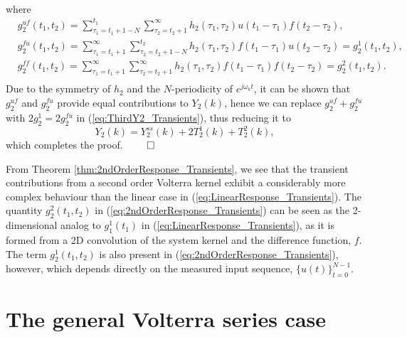 \begin{proof*}
\begin{equation}
\begin{aligned}
\end{aligned}
\end{equation}
where
\begin{equation}
\begin{aligned}
&g_2^{uf}(t_1,t_2) = \sum_{\tau_1 = t_1+1-N}^{t_1} \sum_{\tau_2 = t_2+1}^{\infty} h_2(\tau_1,\tau_2) u(t_1-\tau_1) f(t_2-\tau_2),\\
&g_2^{fu}(t_1,t_2) = \sum_{\tau_1 = t_1+1}^{\infty} \sum_{\tau_2 = t_2+1-N}^{t_2} h_2(\tau_1,\tau_2) f(t_1-\tau_1) u(t_2-\tau_2) = g_2^1(t_1,t_2) ,\\
&g_2^{ff}(t_1,t_2) = \sum_{\tau_1 = t_1+1}^{\infty} \sum_{\tau_2 = t_2+1}^{\infty} h_2(\tau_1,\tau_2) f(t_1-\tau_1) f(t_2-\tau_2) = g_2^2(t_1,t_2).\\
\end{aligned}
\end{equation}
Due to the symmetry of $h_2$ and the $N$-periodicity of $e^{j \omega_k t}$, it can be shown that $g_2^{uf}$ and $g_2^{fu}$ provide equal contributions to $Y_2(k)$, hence we can replace $g_2^{uf}+g_2^{fu}$ with $2 g_2^1 = 2 g_2^{fu}$ in (\ref{eq:ThirdY2_Transients}), thus reducing it to
\begin{equation}
Y_2(k) = Y_2^{ss}(k) + 2T_2^1(k) + T_2^2(k),
\end{equation}
which completes the proof. \hfill $\qed$
\end{proof*}

From Theorem \ref{thm:2ndOrderResponse_Transients}, we see that the transient contributions from a second order Volterra kernel exhibit a considerably more complex behaviour than the linear case in (\ref{eq:LinearResponse_Transients}). The quantity $g_2^2(t_1,t_2)$ in (\ref{eq:2ndOrderResponse_Transients}) can be seen as the 2-dimensional analog to $g_1^1(t_1)$ in (\ref{eq:LinearResponse_Transients}), as it is formed from a 2D convolution of the system kernel and the difference function, $f$. The term $g_2^1(t_1,t_2)$ is also present in (\ref{eq:2ndOrderResponse_Transients}), however, which depends directly on the measured input sequence, $\{u(t)\}_{t=0}^{N-1}$.

\section{The general Volterra series case}
\label{sec:GeneralCase_Transients}

